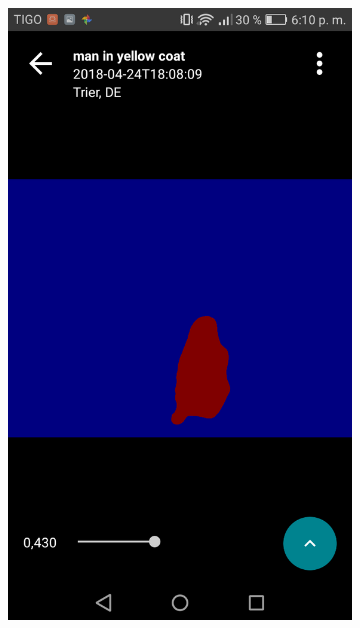 \begin{figure}[!htbp]
    \centering
    \begin{multicols}{2}
    \begin{subfigure}[b]{\columnwidth}
            \centering
            \includegraphics[width=\textwidth]{./figures/dmn_app/views/10.png}
    \label{subfig:thresh_heat}
    \end{subfigure}
    

\end{multicols}
\end{figure}
